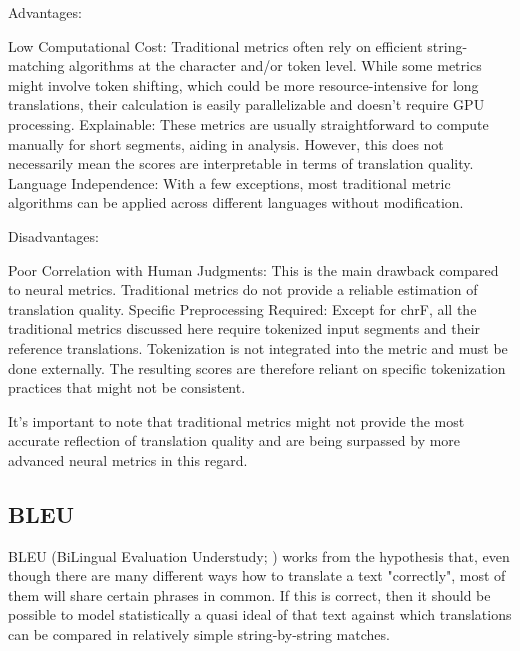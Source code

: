 Advantages:

    Low Computational Cost: Traditional metrics often rely on efficient string-matching algorithms at the character and/or token level. While some metrics might involve token shifting, which could be more resource-intensive for long translations, their calculation is easily parallelizable and doesn't require GPU processing.
    Explainable: These metrics are usually straightforward to compute manually for short segments, aiding in analysis. However, this does not necessarily mean the scores are interpretable in terms of translation quality.
    Language Independence: With a few exceptions, most traditional metric algorithms can be applied across different languages without modification.

Disadvantages:

    Poor Correlation with Human Judgments: This is the main drawback compared to neural metrics. Traditional metrics do not provide a reliable estimation of translation quality.
    Specific Preprocessing Required: Except for chrF, all the traditional metrics discussed here require tokenized input segments and their reference translations. Tokenization is not integrated into the metric and must be done externally. The resulting scores are therefore reliant on specific tokenization practices that might not be consistent.

It's important to note that traditional metrics might not provide the most accurate reflection of translation quality and are being surpassed by more advanced neural metrics in this regard.




\subsection{BLEU}
BLEU (BiLingual Evaluation Understudy; \cite{bleu}) works from the hypothesis that, even though there are many different
ways how to translate a text "correctly", most of them will share certain phrases in common. If this is correct, then it should
be possible to model statistically a quasi ideal of that text against which translations can be compared in relatively simple 
string-by-string matches. 






